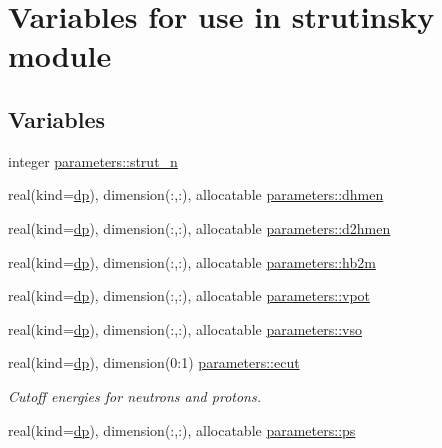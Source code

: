 \hypertarget{group__STRUTINSKY}{}\section{Variables for use in strutinsky module}
\label{group__STRUTINSKY}
\subsection*{Variables}
\begin{DoxyCompactItemize}
\item 
integer \mbox{\hyperlink{group__STRUTINSKY_gac439f84f31aadb3d8940c87b8031f3c5}{parameters\+::strut\+\_\+n}}
\item 
real(kind=\mbox{\hyperlink{namespaceparameters_a52f8c6351fd79345d8811e065bcbbb37}{dp}}), dimension(\+:,\+:), allocatable \mbox{\hyperlink{group__STRUTINSKY_ga5b0cdd0835c3f087c5da53f73ad08bf3}{parameters\+::dhmen}}
\item 
real(kind=\mbox{\hyperlink{namespaceparameters_a52f8c6351fd79345d8811e065bcbbb37}{dp}}), dimension(\+:,\+:), allocatable \mbox{\hyperlink{group__STRUTINSKY_ga51f921a516a9571cb7f002e059909a30}{parameters\+::d2hmen}}
\item 
real(kind=\mbox{\hyperlink{namespaceparameters_a52f8c6351fd79345d8811e065bcbbb37}{dp}}), dimension(\+:,\+:), allocatable \mbox{\hyperlink{group__STRUTINSKY_ga4faafec43e7b862ce36b7c191f7a5b72}{parameters\+::hb2m}}
\item 
real(kind=\mbox{\hyperlink{namespaceparameters_a52f8c6351fd79345d8811e065bcbbb37}{dp}}), dimension(\+:,\+:), allocatable \mbox{\hyperlink{group__STRUTINSKY_gab6a00a0a328c2e57dbb345301d691e78}{parameters\+::vpot}}
\item 
real(kind=\mbox{\hyperlink{namespaceparameters_a52f8c6351fd79345d8811e065bcbbb37}{dp}}), dimension(\+:,\+:), allocatable \mbox{\hyperlink{group__STRUTINSKY_gaf3ea0455435866d9d7095b02b9e40436}{parameters\+::vso}}
\item 
real(kind=\mbox{\hyperlink{namespaceparameters_a52f8c6351fd79345d8811e065bcbbb37}{dp}}), dimension(0\+:1) \mbox{\hyperlink{group__STRUTINSKY_gad6c6de2d2e65ad858f92af1a84c8b24b}{parameters\+::ecut}}
\begin{DoxyCompactList}\small\item\em Cutoff energies for neutrons and protons. \end{DoxyCompactList}\item 
real(kind=\mbox{\hyperlink{namespaceparameters_a52f8c6351fd79345d8811e065bcbbb37}{dp}}), dimension(\+:,\+:), allocatable \mbox{\hyperlink{group__STRUTINSKY_gace20a26f9d6d1c052703baf791c04716}{parameters\+::ps}}

\end{DoxyCompactItemize}
